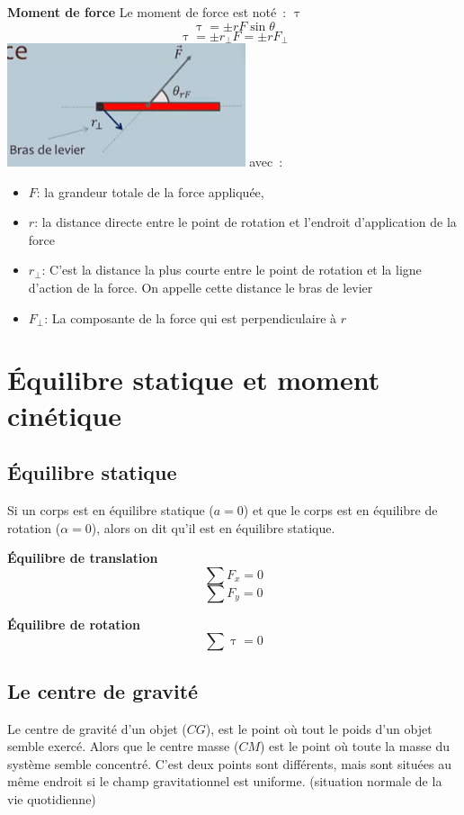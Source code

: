 \documentclass{article}
\begin{document}
\noindent
\newline
\textbf{Moment de force}
Le moment de force est noté : $\uptau$
\[\uptau = \pm rF\sin\theta\]
\[\uptau = \pm r_{\bot}F = \pm rF_{\bot}\]
\includegraphics[width=7cm]{Image/MomentDeForce.png}
\newline
avec :
\begin{itemize}
    \item $F$: la grandeur totale de la force appliquée,
    \item $r$: la distance directe entre le point de rotation et l'endroit d'application de la force
    \item $r_{\bot}$: C'est la distance la plus courte entre le point de rotation et la ligne d'action de la force. On appelle cette distance le bras de levier
    \item $F_{\bot}$: La composante de la force qui est perpendiculaire à $r$
\end{itemize}

\section{Équilibre statique et moment cinétique}
\subsection{Équilibre statique}
Si un corps est en équilibre statique ($a = 0$) et que le corps est en équilibre de rotation ($\alpha = 0$), alors on dit qu'il est en équilibre statique.
\newline

\noindent
\textbf{Équilibre de translation}
\[\sum F_x = 0\]
\[\sum F_y = 0\]
\newline

\noindent
\textbf{Équilibre de rotation}
\[\sum \uptau = 0\]

\subsection{Le centre de gravité}
Le centre de gravité d'un objet ($CG$), est le point où tout le poids d'un objet semble exercé. Alors que le centre masse ($CM$) est le point où toute la masse du système semble concentré. C'est deux points sont différents, mais sont situées au même endroit si le champ gravitationnel est uniforme. (situation normale de la vie quotidienne)
\end{document}

